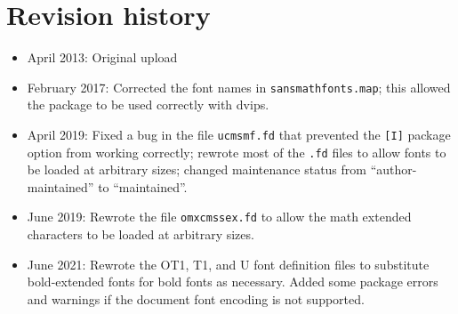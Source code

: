 \documentclass{amsart}
\begin{document}
\section{Revision history}

\begin{itemize}
\item
April 2013: Original upload
\item
February 2017: Corrected the font names in \texttt{sansmathfonts.map}; this allowed the package to be used correctly with \textsf{dvips}.  
\item
April 2019: Fixed a bug in the file \texttt{ucmsmf.fd} that prevented the \texttt{[I]} package option from working correctly; rewrote most of the \texttt{.fd} files to allow fonts to be loaded at arbitrary sizes; changed maintenance status from ``author-maintained'' to ``maintained''.
\item
June 2019: Rewrote the file \texttt{omxcmssex.fd} to allow the math extended characters to be loaded at arbitrary sizes.
\item
June 2021: Rewrote the OT1, T1, and U font definition files to substitute bold-extended fonts for bold fonts as necessary. Added some package errors and warnings if the document font encoding is not supported.
\end{itemize}
\end{document}
